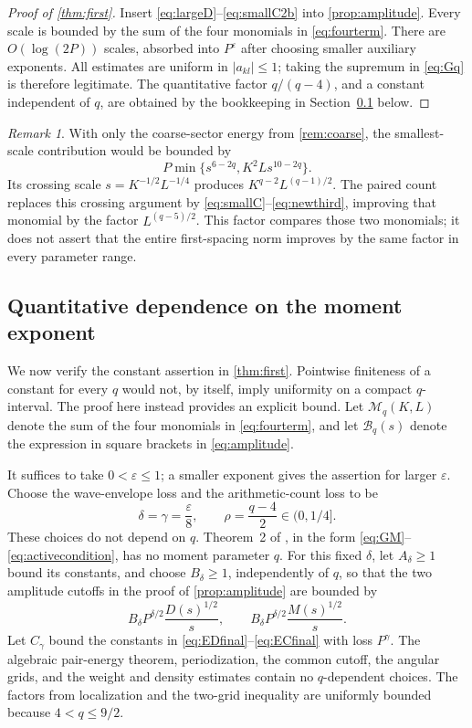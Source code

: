 \documentclass[11pt,reqno]{amsart}
\numberwithin{equation}{section}
\theoremstyle{definition}
\theoremstyle{remark}
\newtheorem{remark}[remark]{Remark}
\newcommand{\eps}{\varepsilon}
\begin{document}
\begin{proof}[Proof of \cref{thm:first}]
Insert \eqref{eq:largeD}--\eqref{eq:smallC2b} into \cref{prop:amplitude}.
Every scale is bounded by the sum of the four monomials in \eqref{eq:fourterm}.
There are $O(\log(2P))$ scales, absorbed into $P^\eps$ after choosing smaller auxiliary exponents.
All estimates are uniform in $|a_{kl}|\le1$; taking the supremum in \eqref{eq:Gq} is therefore legitimate.
The quantitative factor $q/(q-4)$, and a constant independent of $q$, are obtained by the bookkeeping in Section~\ref{sec:quniform} below.
\end{proof}

\begin{remark}\label{rem:newversusold}
With only the coarse-sector energy from \cref{rem:coarse}, the smallest-scale contribution would be bounded by
\[
 P\min\{s^{6-2q},K^2L s^{10-2q}\}.
\]
Its crossing scale $s=K^{-1/2}L^{-1/4}$ produces
$K^{q-2}L^{(q-1)/2}$.
The paired count replaces this crossing argument by \eqref{eq:smallC}--\eqref{eq:newthird}, improving that monomial by the factor
$L^{(q-5)/2}$.
This factor compares those two monomials; it does not assert that the entire first-spacing norm improves by the same factor in every parameter range.
\end{remark}


\subsection{Quantitative dependence on the moment exponent}\label{sec:quniform}
We now verify the constant assertion in \cref{thm:first}. Pointwise finiteness of a constant for every $q$ would not, by itself, imply uniformity on a compact $q$-interval.
The proof here instead provides an explicit bound.
Let $\mathcal M_q(K,L)$ denote the sum of the four monomials in \eqref{eq:fourterm}, and let $\mathcal B_q(s)$ denote the expression in square brackets in \eqref{eq:amplitude}.

It suffices to take $0<\eps\le1$; a smaller exponent gives the assertion for larger $\eps$.
Choose the wave-envelope loss and the arithmetic-count loss to be
\begin{equation}\label{eq:uniformlosschoices}
 \delta=\gamma=\frac{\eps}{8},
 \qquad \rho=\frac{q-4}{2}\in(0,1/4].
\end{equation}
These choices do not depend on $q$.
Theorem~2 of \cite{GM}, in the form \eqref{eq:GM}--\eqref{eq:activecondition}, has no moment parameter $q$.
For this fixed $\delta$, let $A_\delta\ge1$ bound its constants, and choose $B_\delta\ge1$, independently of $q$, so that the two amplitude cutoffs in the proof of \cref{prop:amplitude} are bounded by
\[
 B_\delta P^{\delta/2}\frac{D(s)^{1/2}}s,
 \qquad
 B_\delta P^{\delta/2}\frac{M(s)^{1/2}}s.
\]
Let $C_\gamma$ bound the constants in \eqref{eq:EDfinal}--\eqref{eq:ECfinal} with loss $P^\gamma$.
The algebraic pair-energy theorem, periodization, the common cutoff, the angular grids, and the weight and density estimates contain no $q$-dependent choices.
The factors from localization and the two-grid inequality are uniformly bounded because $4<q\le9/2$.
\end{document}
